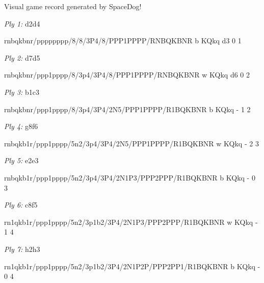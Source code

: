 \documentclass{article}
\begin{document}
{\huge Visual game record generated by SpaceDog!}

\medskip

\newgame

\emph{Ply 1:} d2d4


rnbqkbnr/pppppppp/8/8/3P4/8/PPP1PPPP/RNBQKBNR b KQkq d3 0 1


\showboard

\bigskip

\emph{Ply 2:} d7d5

rnbqkbnr/ppp1pppp/8/3p4/3P4/8/PPP1PPPP/RNBQKBNR w KQkq d6 0 2


\showboard

\bigskip

\emph{Ply 3:} b1c3


rnbqkbnr/ppp1pppp/8/3p4/3P4/2N5/PPP1PPPP/R1BQKBNR b KQkq - 1 2


\showboard

\bigskip

\emph{Ply 4:} g8f6

rnbqkb1r/ppp1pppp/5n2/3p4/3P4/2N5/PPP1PPPP/R1BQKBNR w KQkq - 2 3


\showboard

\bigskip

\emph{Ply 5:} e2e3


rnbqkb1r/ppp1pppp/5n2/3p4/3P4/2N1P3/PPP2PPP/R1BQKBNR b KQkq - 0 3


\showboard

\bigskip

\emph{Ply 6:} c8f5

rn1qkb1r/ppp1pppp/5n2/3p1b2/3P4/2N1P3/PPP2PPP/R1BQKBNR w KQkq - 1 4


\showboard

\bigskip

\emph{Ply 7:} h2h3


rn1qkb1r/ppp1pppp/5n2/3p1b2/3P4/2N1P2P/PPP2PP1/R1BQKBNR b KQkq - 0 4
\end{document}
